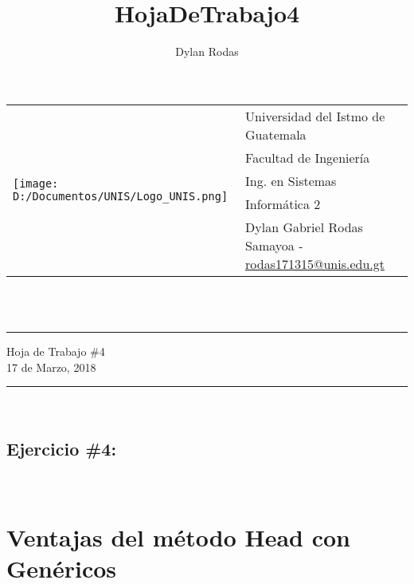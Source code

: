 \documentclass[10pt,a4paper]{article}
\author{Dylan Rodas}
\title{HojaDeTrabajo4}
\newcommand{\horrule}[1]{\rule{\linewidth}{#1}}
\begin{document}
    
        \begin{tabular}{l l}
         \multirow{5}{*}{\texttt{[image: D:/Documentos/UNIS/Logo\_UNIS.png]}} & Universidad del Istmo de Guatemala \\
         & Facultad de Ingenier\'ia \\
         & Ing. en Sistemas \\
         & Inform\'atica 2 \\
         & Dylan Gabriel Rodas Samayoa - \href{mailto:rodas171315@unis.edu.gt}{rodas171315@unis.edu.gt} \\
        \end{tabular}
        \\\    
        
        \begin{center}
            \horrule{0.5pt}
            \huge{Hoja de Trabajo \#4} \\
            \large{17 de Marzo, 2018} \\
            \horrule{1pt}
        \end{center}
        \
        \begin{center}
        \section*{Ejercicio \#4:}
        \end{center}
        \
        \section*{Ventajas del m\'etodo Head con Gen\'ericos}
\end{document}
